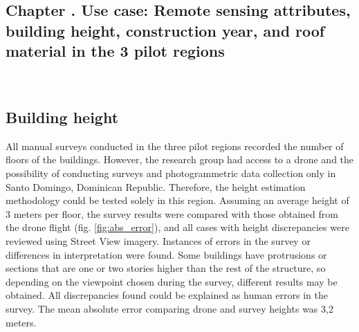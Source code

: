 \graphicspath{
    {figures_and_references/urban_surface_detection/}
    {figures_and_references/EELISA_conference/}
    {figures_and_references/footprints_paper/}
}

\renewcommand{\chapternametext}{Chapter \thechapter . Use case: Remote sensing attributes, building height, construction year, and roof material in the 3 pilot regions}
\renewcommand{\shortchapternametext}{Chapter \thechapter . Use case: Height, year and roof material}

\begin{refsection}

\chapter{\chapternametext}
\

\renewcommand{\headingtextL}{}
\renewcommand{\headingtextR}{\shortchapternametext}
\begingroup
 \flushbottom
 \setlength{\parskip}{0pt plus 1fil}%
 \localtableofcontents 
\endgroup

\begingroup
 \flushbottom
 \setlength{\parskip}{0pt plus 1fil}%
 \locallistoffigures
\endgroup


\newpage

\setcounter{section}{0} 

\FloatBarrier

\renewcommand{\sectionnametext}{Building height}
\renewcommand{\headingtextR}{\thesection. \sectionnametext}
\section{\sectionnametext}

All manual surveys conducted in the three pilot regions recorded the number of floors of the buildings. However, the research group had access to a drone and the possibility of conducting surveys and photogrammetric data collection only in Santo Domingo, Dominican Republic. Therefore, the height estimation methodology could be tested solely in this region. Assuming an average height of 3 meters per floor, the survey results were compared with those obtained from the drone flight (fig. \ref{fig:abs_error}), and all cases with height discrepancies were reviewed using Street View imagery. Instances of errors in the survey or differences in interpretation were found. Some buildings have protrusions or sections that are one or two stories higher than the rest of the structure, so depending on the viewpoint chosen during the survey, different results may be obtained. All discrepancies found could be explained as human errors in the survey. The mean absolute error comparing drone and survey heights was 3,2 meters. 


\end{refsection}
